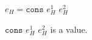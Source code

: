 \begin{case}

$e_{H}=\mathtt{cons}$ $e_{H}^{1}$ $e_{H}^{2}$

$\mathtt{cons}$ $e_{H}^{1}$ $e_{H}^{2}$ is a value.

\end{case}